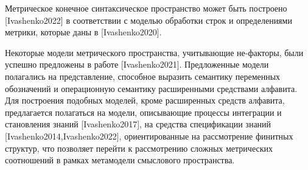 Метрическое конечное синтаксическое пространство может быть построено [Ivashenko2022] в соответствии с моделью обработки строк и определениями метрики, которые даны в [Ivashenko2020].

\begin{SCn}
\end{SCn}

\begin{SCn}
\end{SCn}

\begin{SCn}
\end{SCn}

Некоторые модели метрического пространства, учитывающие не‑факторы, были успешно предложены в работе [Ivashenko2021]. Предложенные модели полагались на представление, способное выразить семантику переменных обозначений и операционную семантику расширенными средствами алфавита. Для построения подобных моделей, кроме расширенных средств алфавита, предлагается полагаться на модели, описывающие процессы интеграции и становления знаний [Ivashenko2017], на средства спецификации знаний [Ivashenko2014,Ivashenko2022], ориентированные на рассмотрение финитных структур, что позволяет перейти к рассмотрению сложных метрических соотношений в рамках метамодели смыслового пространства.

